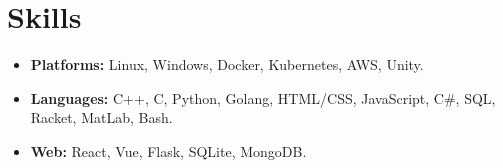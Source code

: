 \section*{Skills}
\begin{itemize}
    \item 
    \textbf{Platforms:} Linux, Windows, Docker, Kubernetes, AWS, Unity.
    \item 
    \textbf{Languages:} C++, C, Python, Golang, HTML/CSS, JavaScript, C\#, SQL, Racket, MatLab, Bash.
    \item 
    \textbf{Web:} React, Vue, Flask, SQLite, MongoDB.
\end{itemize}
